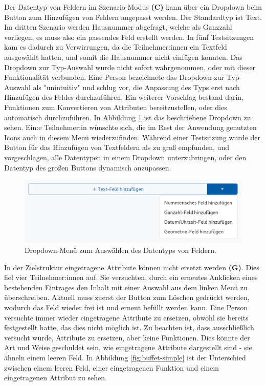 Der Datentyp von Feldern im Szenario-Modus \textbf{(C)} kann über ein Dropdown beim Button zum Hinzufügen von Feldern angepasst werden. Der Standardtyp ist Text. Im dritten Szenario werden Hausnummer abgefragt, welche als Ganzzahl vorliegen, es muss also ein passendes Feld erstellt werden. In fünf Testsitzungen kam es dadurch zu Verwirrungen, da die Teilnehmer:innen ein Textfeld ausgewählt hatten, und somit die Hausnummer nicht einfügen konnten. Das Dropdown zur Typ-Auswahl wurde nicht sofort wahrgenommen, oder mit dieser Funktionalität verbunden. Eine Person bezeichnete das Dropdown zur Typ-Auswahl als "unintuitiv" und schlug vor, die Anpassung des Typs erst nach Hinzufügen des Feldes durchzuführen. Ein weiterer Vorschlag bestand darin, Funktionen zum Konvertieren von Attributen bereitzustellen, oder dies automatisch durchzuführen. In Abbildung \ref{fig:type-dropdown} ist das beschriebene Dropdown zu sehen. Ein:e Teilnehmer:in wünschte sich, die im Rest der Anwendung genutzten Icons auch in diesem Menü wiederzufinden. Während einer Testsitzung wurde der Button für das Hinzufügen von Textfeldern als zu groß empfunden, und vorgeschlagen, alle Datentypen in einem Dropdown unterzubringen, oder den Datentyp des großen Buttons dynamisch anzupassen.

\begin{figure}
  \centering
  \includegraphics[width=.9\textwidth]{assets/datatype-dropdown.png}
  \caption[Dropdown-Menü zum Auswählen des Datentyps von Feldern]{Dropdown-Menü zum Auswählen des Datentyps von Feldern.}
  \label{fig:type-dropdown}
\end{figure}

In der Zielstruktur eingetragene Attribute können nicht ersetzt werden \textbf{(G)}. Dies fiel vier Teilnehmer:innen auf. Sie versuchten, durch ein erneutes Anklicken eines bestehenden Eintrages den Inhalt mit einer Auswahl aus dem linken Menü zu überschreiben. Aktuell muss zuerst der Button zum Löschen gedrückt werden, wodurch das Feld wieder frei ist und erneut befüllt werden kann. Eine Person versuchte immer wieder eingetragene Attribute zu ersetzen, obwohl sie bereits festgestellt hatte, das dies nicht möglich ist. Zu beachten ist, dass ausschließlich versucht wurde, Attribute zu ersetzen, aber keine Funktionen. Dies könnte der Art und Weise geschuldet sein, wie eingetragene Attribute dargestellt sind - sie ähneln einem leeren Feld. In Abbildung \ref{fig:buffet-simple} ist der Unterschied zwischen einem leeren Feld, einer eingetragenen Funktion und einem eingetragenen Attribut zu sehen.

